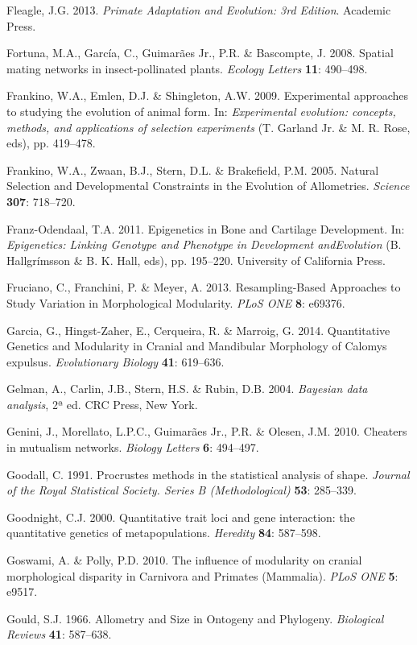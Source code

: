 \documentclass[12pt,twoside]{report}
\begin{document}
Fleagle, J.G. 2013. \emph{Primate Adaptation and Evolution: 3rd
Edition}. Academic Press.

Fortuna, M.A., García, C., Guimarães Jr., P.R. \& Bascompte, J. 2008.
Spatial mating networks in insect-pollinated plants. \emph{Ecology
Letters} \textbf{11}: 490--498.

Frankino, W.A., Emlen, D.J. \& Shingleton, A.W. 2009. Experimental
approaches to studying the evolution of animal form. In:
\emph{Experimental evolution: concepts, methods, and applications of
selection experiments} (T. Garland Jr. \& M. R. Rose, eds), pp.
419--478.

Frankino, W.A., Zwaan, B.J., Stern, D.L. \& Brakefield, P.M. 2005.
Natural Selection and Developmental Constraints in the Evolution of
Allometries. \emph{Science} \textbf{307}: 718--720.

Franz-Odendaal, T.A. 2011. Epigenetics in Bone and Cartilage
Development. In: \emph{Epigenetics: Linking Genotype and Phenotype in
Development andEvolution} (B. Hallgrímsson \& B. K. Hall, eds), pp.
195--220. University of California Press.

Fruciano, C., Franchini, P. \& Meyer, A. 2013. Resampling-Based
Approaches to Study Variation in Morphological Modularity. \emph{PLoS
ONE} \textbf{8}: e69376.

Garcia, G., Hingst-Zaher, E., Cerqueira, R. \& Marroig, G. 2014.
Quantitative Genetics and Modularity in Cranial and Mandibular
Morphology of Calomys expulsus. \emph{Evolutionary Biology} \textbf{41}:
619--636.

Gelman, A., Carlin, J.B., Stern, H.S. \& Rubin, D.B. 2004.
\emph{Bayesian data analysis}, 2ª ed. CRC Press, New York.

Genini, J., Morellato, L.P.C., Guimarães Jr., P.R. \& Olesen, J.M. 2010.
Cheaters in mutualism networks. \emph{Biology Letters} \textbf{6}:
494--497.

Goodall, C. 1991. Procrustes methods in the statistical analysis of
shape. \emph{Journal of the Royal Statistical Society. Series B
(Methodological)} \textbf{53}: 285--339.

Goodnight, C.J. 2000. Quantitative trait loci and gene interaction: the
quantitative genetics of metapopulations. \emph{Heredity} \textbf{84}:
587--598.

Goswami, A. \& Polly, P.D. 2010. The influence of modularity on cranial
morphological disparity in Carnivora and Primates (Mammalia). \emph{PLoS
ONE} \textbf{5}: e9517.

Gould, S.J. 1966. Allometry and Size in Ontogeny and Phylogeny.
\emph{Biological Reviews} \textbf{41}: 587--638.
\end{document}
